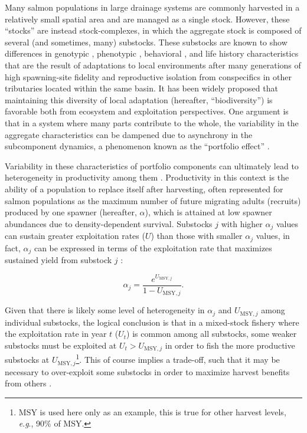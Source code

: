 \documentclass[12pt,]{book}
\let\rmarkdownfootnote\footnote%
\def\footnote{\protect\rmarkdownfootnote}
\theoremstyle{definition}
\theoremstyle{definition}
\theoremstyle{definition}
\theoremstyle{remark}
\begin{document}
\noindent
Many salmon populations in large drainage systems are commonly harvested
in a relatively small spatial area and are managed as a single stock.
However, these ``stocks'' are instead stock-complexes, in which the
aggregate stock is composed of several (and sometimes, many) substocks.
These substocks are known to show differences in genotypic
\citep{templin-etal-2004}, phenotypic \citep[\emph{e}.\emph{g}.,
morphology;][]{hendry-quinn-1997}, behavioral \citep[\emph{e}.\emph{g}.,
run timing;][]{clark-etal-2015, smith-liller-2017a, smith-liller-2017b},
and life history \citep[\emph{e}.\emph{g}.,
age-at-maturation,][]{blair-etal-1993} characteristics that are the
result of adaptations to local environments after many generations of
high spawning-site fidelity and reproductive isolation from conspecifics
in other tributaries located within the same basin. It has been widely
proposed that maintaining this diversity of local adaptation (hereafter,
``biodiversity'') is favorable both from ecosystem and exploitation
perspectives. One argument is that in a system where many parts
contribute to the whole, the variability in the aggregate
characteristics can be dampened due to asynchrony in the subcomponent
dynamics, a phenomenon known as the ``portfolio effect''
\citep{schindler-etal-2010, schindler-etal-2015}.

Variability in these characteristics of portfolio components can
ultimately lead to heterogeneity in productivity among them
\citep{walters-martell-2004}. Productivity in this context is the
ability of a population to replace itself after harvesting, often
represented for salmon populations as the maximum number of future
migrating adults (recruits) produced by one spawner (hereafter,
\(\alpha\)), which is attained at low spawner abundances due to
density-dependent survival. Substocks \(j\) with higher \(\alpha_j\)
values can sustain greater exploitation rates (\(U\)) than those with
smaller \(\alpha_j\) values, in fact, \(\alpha_j\) can be expressed in
terms of the exploitation rate that maximizes sustained yield from
substock \(j\) \citep[\(U_{\text{MSY},j}\);][]{schnute-kronlund-2002}:

\begin{equation}
  \alpha_j=\frac{e^{U_{\text{MSY},j}}}{1 - U_{\text{MSY},j}}.
  \label{eq:umsy-to-alpha}
\end{equation}

Given that there is likely some level of heterogeneity in \(\alpha_j\)
and \(U_{\text{MSY},j}\) among individual substocks, the logical
conclusion is that in a mixed-stock fishery where the exploitation rate
in year \(t\) (\(U_t\)) is common among all substocks, some weaker
substocks must be exploited at \(U_t > U_{\text{MSY},j}\) in order to
fish the more productive substocks at \(U_{\text{MSY},j}\)\footnote{MSY
  is used here only as an example, this is true for other harvest
  levels, \emph{e}.\emph{g}., 90\% of MSY.}. This of course implies a
trade-off, such that it may be necessary to over-exploit some substocks
in order to maximize harvest benefits from others \citep[Figure
\ref{fig:trade-off-plot},][]{walters-martell-2004}.
\end{document}
